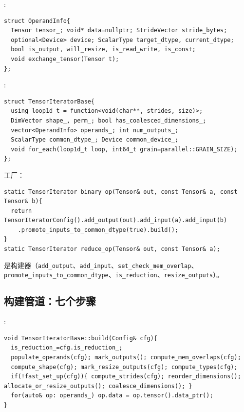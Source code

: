 :

\begin{lstlisting}[caption={\texttt{OperandInfo} .}, label=lst:operandinfo]
struct OperandInfo{
  Tensor tensor_; void* data=nullptr; StrideVector stride_bytes;
  optional<Device> device; ScalarType target_dtype, current_dtype;
  bool is_output, will_resize, is_read_write, is_const;
  void exchange_tensor(Tensor t);
};
\end{lstlisting}

:

\begin{lstlisting}[caption={state.}, label=lst:tibase]
struct TensorIteratorBase{
  using loop1d_t = function<void(char**, strides, size)>;
  DimVector shape_, perm_; bool has_coalesced_dimensions_;
  vector<OperandInfo> operands_; int num_outputs_;
  ScalarType common_dtype_; Device common_device_;
  void for_each(loop1d_t loop, int64_t grain=parallel::GRAIN_SIZE);
};
\end{lstlisting}

工厂：

\begin{lstlisting}[caption={factories.}, label=lst:tifactories]
static TensorIterator binary_op(Tensor& out, const Tensor& a, const Tensor& b){
  return TensorIteratorConfig().add_output(out).add_input(a).add_input(b)
    .promote_inputs_to_common_dtype(true).build();
}
static TensorIterator reduce_op(Tensor& out, const Tensor& a);
\end{lstlisting}

是构建器（\texttt{add\_output}、\texttt{add\_input}、\texttt{set\_check\_mem\_overlap}、\texttt{promote\_inputs\_to\_common\_dtype}、\texttt{is\_reduction}、\texttt{resize\_outputs}）。

\subsection{构建管道：七个步骤}

:

\begin{lstlisting}[caption={seven steps.}, label=lst:tibuild]
void TensorIteratorBase::build(Config& cfg){
  is_reduction_=cfg.is_reduction_;
  populate_operands(cfg); mark_outputs(); compute_mem_overlaps(cfg);
  compute_shape(cfg); mark_resize_outputs(cfg); compute_types(cfg);
  if(!fast_set_up(cfg)){ compute_strides(cfg); reorder_dimensions(); allocate_or_resize_outputs(); coalesce_dimensions(); }
  for(auto& op: operands_) op.data = op.tensor().data_ptr();
}
\end{lstlisting}


